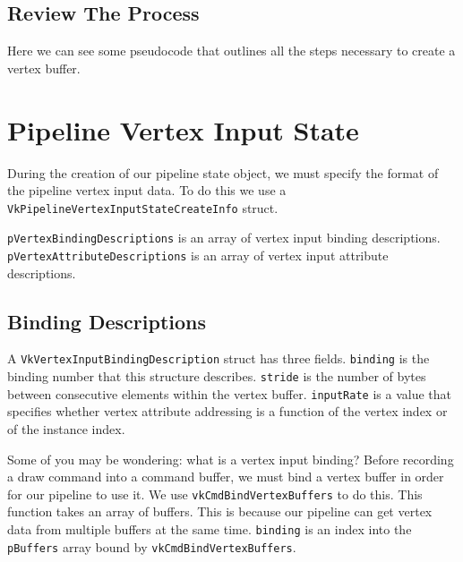 \subsection{Review The Process}

Here we can see some pseudocode that outlines all the steps necessary to
create a vertex buffer.

\begin{minipage}{\linewidth}{\noindent}
    
\end{minipage}

\section{Pipeline Vertex Input State}

During the creation of our pipeline state object, we must specify
the format of the pipeline vertex input data.
To do this we use a \texttt{VkPipelineVertexInputStateCreateInfo} struct.

\begin{minipage}{\linewidth}{\noindent}
    
\end{minipage}

\texttt{pVertexBindingDescriptions} is an array of vertex input binding descriptions.
\texttt{pVertexAttributeDescriptions} is an array of vertex input attribute descriptions.

\subsection{Binding Descriptions}

A \texttt{VkVertexInputBindingDescription} struct has three fields.
\texttt{binding} is the binding number that this structure describes.
\texttt{stride} is the number of bytes between consecutive elements within the
vertex buffer.
\texttt{inputRate} is a value that specifies whether vertex attribute addressing
is a function of the vertex index or of the instance index.

Some of you may be wondering: what is a vertex input binding?
Before recording a draw command into a command buffer,
we must bind a vertex buffer in order for our pipeline to use it.
We use \texttt{vkCmdBindVertexBuffers} to do this.
This function takes an array of buffers.
This is because our pipeline can get vertex data from multiple buffers
at the same time.
\texttt{binding} is an index into the \texttt{pBuffers} array bound by
\texttt{vkCmdBindVertexBuffers}.

